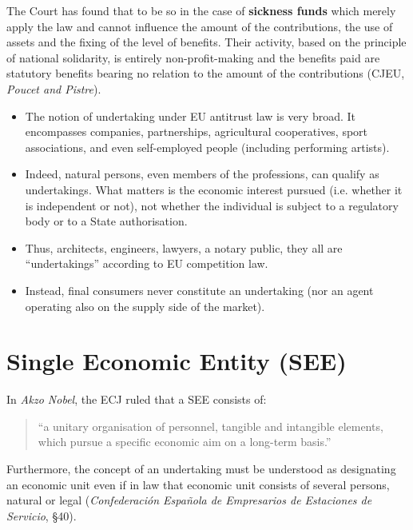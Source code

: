     The Court has found that to be so in the case of \textbf{sickness funds} which merely apply the law and cannot influence the amount of the contributions, the use of assets and the fixing of the level of benefits. Their activity, based on the principle of national solidarity, is entirely non-profit-making and the benefits paid are statutory benefits bearing no relation to the amount of the contributions (CJEU, \textit{Poucet and Pistre}).

    \begin{itemize}
        \item The notion of undertaking under EU antitrust law is very broad. It encompasses companies, partnerships, agricultural cooperatives, sport associations, and even self-employed people (including performing artists).
        \item Indeed, natural persons, even members of the professions, can qualify as undertakings. What matters is the economic interest pursued (i.e. whether it is independent or not), not whether the individual is subject to a regulatory body or to a State authorisation.
        \item Thus, architects, engineers, lawyers, a notary public, they all are ``undertakings'' according to EU competition law.
        \item Instead, final consumers never constitute an undertaking (nor an agent operating also on the supply side of the market).
    \end{itemize}

\section{Single Economic Entity (SEE)}

    In \textit{Akzo Nobel}, the ECJ ruled that a SEE consists of:
    \begin{quote}
    ``a unitary organisation of personnel, tangible and intangible elements, which pursue a specific economic aim on a long-term basis.''
    \end{quote}
    
    Furthermore, the concept of an undertaking must be understood as designating an economic unit even if in law that economic unit consists of several persons, natural or legal (\textit{Confederación Española de Empresarios de Estaciones de Servicio}, §40).
    
